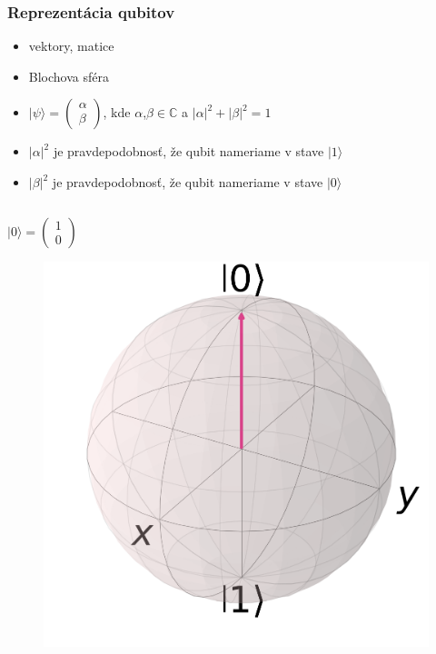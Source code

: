 \documentclass{beamer}
\newcommand{\ket}[1]{\lvert#1\rangle} %
\newcommand\abs[1]{\left|#1\right|}
\begin{document}
\begin{frame}
	\frametitle{Reprezentácia qubitov}
	\begin{itemize}
		\item vektory, matice
		\item Blochova sféra
		\item $\ket{\psi} = \begin{pmatrix}
		      \alpha \\
		      \beta
		\end{pmatrix}$, kde  $\alpha$,$\beta \in \mathbb{C}$ a $\abs{\alpha}^2 + \abs{\beta}^2 = 1$ 
		\item $\abs{\alpha}^2$ je pravdepodobnosť, že qubit nameriame v stave $\ket{1}$
		\item $\abs{\beta}^2$ je pravdepodobnosť, že qubit nameriame v stave $\ket{0}$
	\end{itemize}
	\begin{columns}[c]
		\begin{column}{.3\textwidth}
			\centering
			$\ket{0} = \begin{pmatrix}
			1\\
			0
			\end{pmatrix}$
			\begin{figure}
				\centering
				\includegraphics[width=1\textwidth]{qubit0.png}            
			\end{figure}
		\end{column}
						

\end{columns}
\end{frame}
\end{document}
